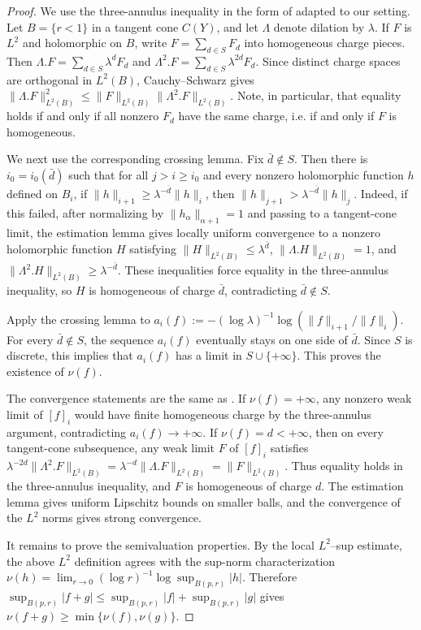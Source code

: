 \documentclass[11pt]{amsart}
\theoremstyle{definition}
\theoremstyle{remark}
\begin{document}
\begin{proof}
We use the three-annulus inequality in the form of \cite[Lemma 3.6]{DSII} adapted to our setting. Let
$B=\{r<1\}$ in a tangent cone $C(Y)$, and let $\Lambda$ denote dilation by
$\lambda$. If $F$ is $L^2$ and holomorphic on $B$, write
$F=\sum_{d\in S}F_d$ into homogeneous charge pieces. Then
$\Lambda.F=\sum_{d\in S}\lambda^dF_d$ and
$\Lambda^2.F=\sum_{d\in S}\lambda^{2d}F_d$. Since distinct charge spaces are
orthogonal in $L^2(B)$, Cauchy--Schwarz gives
$\|\Lambda.F\|_{L^2(B)}^2\leq \|F\|_{L^2(B)}\|\Lambda^2.F\|_{L^2(B)}$.
Note, in particular, that equality holds if and only if all nonzero $F_d$ have the same charge, i.e. if and
only if $F$ is homogeneous.

We next use the corresponding crossing lemma. Fix $\bar d\notin S$. Then there
is $i_0=i_0(\bar d)$ such that for all $j>i\geq i_0$ and every nonzero holomorphic
function $h$ defined on $B_i$, if $\|h\|_{i+1}\geq \lambda^{-\bar d}\|h\|_i$,
then $\|h\|_{j+1}>\lambda^{-\bar d}\|h\|_j$. Indeed, if this failed, after
normalizing by $\|h_\alpha\|_{\alpha+1}=1$ and passing to a tangent-cone limit,
the estimation lemma gives locally uniform convergence to a nonzero holomorphic
function $H$ satisfying
$\|H\|_{L^2(B)}\leq \lambda^{\bar d}$,
$\|\Lambda.H\|_{L^2(B)}=1$, and
$\|\Lambda^2.H\|_{L^2(B)}\geq \lambda^{-\bar d}$. These inequalities force
equality in the three-annulus inequality, so $H$ is homogeneous of charge
$\bar d$, contradicting $\bar d\notin S$.

Apply the crossing lemma to
$a_i(f):=-(\log\lambda)^{-1}\log(\|f\|_{i+1}/\|f\|_i)$. For every
$\bar d\notin S$, the sequence $a_i(f)$ eventually stays on one side of
$\bar d$. Since $S$ is discrete, this implies that $a_i(f)$ has a limit in
$S\cup\{+\infty\}$. This proves the existence of $\nu(f)$.

The convergence statements are the same as \cite[Corollary 3.8]{DSII}. If
$\nu(f)=+\infty$, any nonzero weak limit of $[f]_i$ would have finite homogeneous
charge by the three-annulus argument, contradicting $a_i(f)\to+\infty$. If
$\nu(f)=d<+\infty$, then on every tangent-cone subsequence, any weak limit
$F$ of $[f]_i$ satisfies
$\lambda^{-2d}\|\Lambda^2.F\|_{L^2(B)}
=\lambda^{-d}\|\Lambda.F\|_{L^2(B)}
=\|F\|_{L^2(B)}$.
Thus equality holds in the three-annulus inequality, and $F$ is homogeneous of
charge $d$. The estimation lemma gives uniform Lipschitz bounds on smaller balls,
and the convergence of the $L^2$ norms gives strong convergence.

It remains to prove the semivaluation properties. By the local $L^2$--sup
estimate, the above $L^2$ definition agrees with the sup-norm characterization
$\nu(h)=\lim_{r\to0}(\log r)^{-1}\log\sup_{B(p,r)}|h|$. Therefore
$\sup_{B(p,r)}|f+g|\leq \sup_{B(p,r)}|f|+\sup_{B(p,r)}|g|$ gives
$\nu(f+g)\geq \min\{\nu(f),\nu(g)\}$.


\end{proof}
\end{document}

